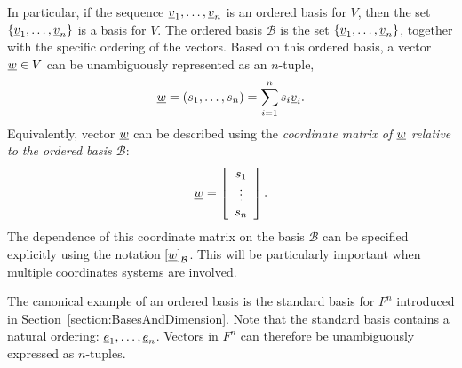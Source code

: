 In particular, if the sequence $\underline{v}_1, \ldots, \underline{v}_n$ is an ordered basis for $V$, then the set $\left\{ \underline{v}_1, \ldots, \underline{v}_n \right\}$ is a basis for $V$.
The ordered basis $\mathcal{B}$ is the set $\left\{ \underline{v}_1, \ldots, \underline{v}_n \right\}$, together with the specific ordering of the vectors.
Based on this ordered basis, a vector $\underline{w} \in V$ can be unambiguously represented as an $n$-tuple,
\begin{equation*}
\underline{w} = (s_1, \ldots, s_n) = \sum_{i=1}^n s_i \underline{v}_i.
\end{equation*}
Equivalently, vector $\underline{w}$ can be described using the \emph{coordinate matrix of $\underline{w}$ relative to the ordered basis $\mathcal{B}$}:
\begin{equation*}
\underline{w} = \left[ \begin{array}{c} s_1 \\ \vdots \\ s_n \end{array} \right].
\end{equation*}
The dependence of this coordinate matrix on the basis $\mathcal{B}$ can be specified explicitly using the notation $\left[ \underline{w} \right]_{\mathcal{B}}$.
This will be particularly important when multiple coordinates systems are involved.

\begin{example}
The canonical example of an ordered basis is the standard basis for $F^n$ introduced in Section~\ref{section:BasesAndDimension}.
Note that the standard basis contains a natural ordering: $\underline{e}_1, \ldots, \underline{e}_n$.
Vectors in $F^n$ can therefore be unambiguously expressed as $n$-tuples.
\end{example}

